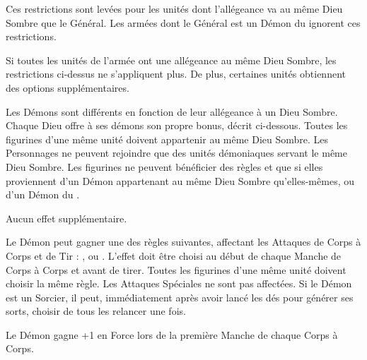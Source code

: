 Ces restrictions sont levées pour les unités dont l'allégeance va au même Dieu Sombre que le Général. Les armées dont le Général est un Démon du \truechaos{} ignorent ces restrictions.

\armyspecialruleentry{\monotheistarmybonus}

Si toutes les unités de l'armée ont une allégeance au même Dieu Sombre, les restrictions ci-dessus ne s'appliquent plus. De plus, certaines unités obtiennent des options supplémentaires.

\closearmywiderules









\newpage
\startarmyspecialrules

\armyspecialruleentry{\daemonofthedarkgods}

Les Démons sont différents en fonction de leur allégeance à un Dieu Sombre. Chaque Dieu offre à ses démons son propre bonus, décrit ci-dessous. Toutes les figurines d'une même unité doivent appartenir au même Dieu Sombre. Les Personnages ne peuvent rejoindre que des unités démoniaques servant le même Dieu Sombre. Les figurines ne peuvent bénéficier des règles \holdyourground{} et \inspiringpresence{} que si elles proviennent d'un Démon appartenant au même Dieu Sombre qu'elles-mêmes, ou d'un Démon du \truechaos{}.

\spacebetweenalliance{}

\hfill{}
Aucun effet supplémentaire.
\allianceclosesidetext{}

\spacebetweenalliance{}

Le Démon peut gagner une des règles suivantes, affectant les Attaques de Corps à Corps et de Tir : \divineattacks{}, \flamingattacks{} ou \hellfire{}. L'effet doit être choisi au début de chaque Manche de Corps à Corps et avant de tirer. Toutes les figurines d'une même unité doivent choisir la même règle. Les Attaques Spéciales ne sont pas affectées. Si le Démon est un Sorcier, il peut, immédiatement après avoir lancé les dés pour générer ses sorts, choisir de tous les relancer une fois.
\allianceclosesidetext{}\hfill
{}

\spacebetweenalliance{}

\hfill{}
Le Démon gagne +1 en Force lors de la première Manche de chaque Corps à Corps.
\allianceclosesidetext{}

